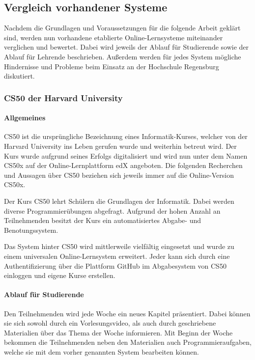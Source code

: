 \subsection{Vergleich vorhandener Systeme}
Nachdem die Grundlagen und Voraussetzungen für die folgende Arbeit geklärt sind,
werden nun vorhandene etablierte Online-Lernsysteme miteinander verglichen und
bewertet. Dabei wird jeweils der Ablauf für Studierende sowie der Ablauf für
Lehrende beschrieben. Außerdem werden für jedes System mögliche Hindernisse und
Probleme beim Einsatz an der Hochschule Regensburg diskutiert.

\subsubsection{CS50 der Harvard University}
\paragraph{Allgemeines}
CS50 ist die ursprüngliche Bezeichnung eines Informatik-Kurses, welcher von der
Harvard University ins Leben gerufen wurde und weiterhin betreut wird. Der Kurs
wurde aufgrund seines Erfolgs digitalisiert und wird nun unter dem Namen CS50x
auf der Online-Lernplattform edX angeboten. Die folgenden Recherchen und
Aussagen über CS50 beziehen sich jeweils immer auf die Online-Version CS50x.

Der Kurs CS50 lehrt Schülern die Grundlagen der Informatik. Dabei werden diverse
Programmierübungen abgefragt. Aufgrund der hohen Anzahl an Teilnehmenden besitzt
der Kurs ein automatisiertes Abgabe- und Benotungssystem.

Das System hinter CS50 wird mittlerweile vielfältig eingesetzt und wurde zu
einem universalen Online-Lernsystem erweitert. Jeder kann sich durch eine
Authentifizierung über die Plattform GitHub im Abgabesystem von CS50 einloggen
und eigene Kurse erstellen. \parencite{cs50}

\paragraph{Ablauf für Studierende}
Den Teilnehmenden wird jede Woche ein neues Kapitel präsentiert. Dabei können
sie sich sowohl durch ein Vorlesungsvideo, als auch durch geschriebene
Materialien über das Thema der Woche informieren. Mit Beginn der Woche bekommen
die Teilnehmenden neben den Materialien auch Programmieraufgaben, welche sie mit
dem vorher genannten System bearbeiten können. \parencite{cs50-edx}

